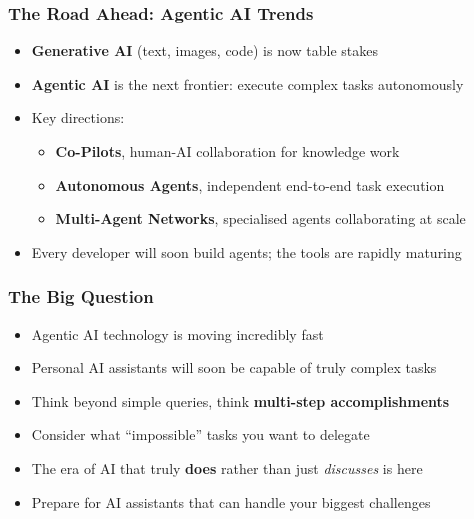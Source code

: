 \begin{frame}[fragile]\frametitle{The Road Ahead: Agentic AI Trends}
\begin{itemize}
    \item \textbf{Generative AI} (text, images, code) is now table stakes
    \item \textbf{Agentic AI} is the next frontier: execute complex tasks autonomously
    \item Key directions:
    \begin{itemize}
        \item \textbf{Co-Pilots}, human-AI collaboration for knowledge work
        \item \textbf{Autonomous Agents}, independent end-to-end task execution
        \item \textbf{Multi-Agent Networks}, specialised agents collaborating at scale
    \end{itemize}
    \item Every developer will soon build agents; the tools are rapidly maturing
\end{itemize}
\end{frame}

\begin{frame}[fragile]\frametitle{The Big Question}
      \begin{itemize}
        \item Agentic AI technology is moving incredibly fast
        \item Personal AI assistants will soon be capable of truly complex tasks
        \item Think beyond simple queries, think \textbf{multi-step accomplishments}
        \item Consider what ``impossible'' tasks you want to delegate
        \item The era of AI that truly \textbf{does} rather than just \emph{discusses} is here
        \item Prepare for AI assistants that can handle your biggest challenges
      \end{itemize}
\end{frame}


